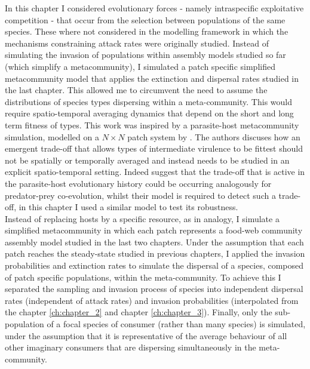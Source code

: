 \documentclass[a4paper]{report}
\begin{document}
In this chapter I considered evolutionary forces - namely intraspecific exploitative competition - that occur from the selection between populations of the same species. These where not considered in the modelling framework in which the mechanisms constraining attack rates were originally studied. Instead of simulating the invasion of populations within assembly models studied so far (which simplify a metacommunity), I simulated a patch specific simplified metacommunity model that applies the extinction and dispersal rates studied in the last chapter. This allowed me to circumvent the need to assume the distributions of species types dispersing within a meta-community. This would require spatio-temporal averaging dynamics that depend on the short and long term fitness of types. This work was inspired by a parasite-host metacommunity simulation, modelled on a $N \times N$ patch system by \citep{Goodnight2008}. The authors discuses how an emergent trade-off that allows types of intermediate virulence to be fittest should not be spatially or temporally averaged and instead needs to be studied in an explicit spatio-temporal setting. Indeed \citep{Goodnight2008} suggest that the trade-off that is active in the parasite-host evolutionary history could be occurring analogously for predator-prey co-evolution, whilst their model is required to detect such a trade-off, in this chapter I used a similar model to test its robustness.\\

Instead of replacing hosts by a specific resource, as in \citep{Goodnight2008} analogy, I simulate a simplified metacommunity in which each patch represents a food-web community assembly model studied in the last two chapters. Under the assumption that each patch reaches the steady-state studied in previous chapters, I applied the invasion probabilities and extinction rates to simulate the dispersal of a species, composed of patch specific populations, within the meta-community. To achieve this I separated the sampling and invasion process of species into independent dispersal rates (independent of attack rates) and invasion probabilities (interpolated from the chapter \ref{ch:chapter_2} and chapter \ref{ch:chapter_3}). Finally, only the sub-population of a focal species of consumer (rather than many species) is simulated, under the assumption that it is representative of the average behaviour of all other imaginary consumers that are dispersing simultaneously in the meta-community.\\
\end{document}
